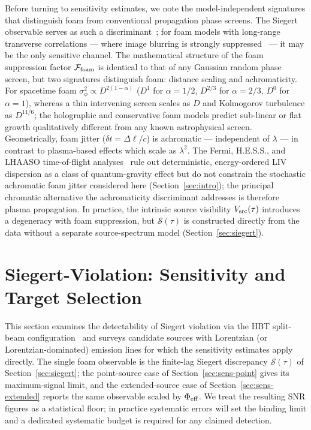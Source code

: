 \documentclass[aps,prd,onecolumn,amsmath,amssymb]{revtex4-2}
\begin{document}
Before turning to sensitivity estimates, we note the model-independent
signatures that distinguish foam from conventional propagation phase
screens.
The Siegert observable serves as such a discriminant~\cite{Carlip2023}; for foam models with
long-range transverse correlations --- where image blurring is strongly
suppressed~\cite{LeeZurekChen2024} --- it may be the only sensitive
channel.  The mathematical structure of the foam suppression factor
$\mathcal{F}_{\rm foam}$ is identical to that of any Gaussian random
phase screen, but two signatures distinguish foam: distance scaling and
achromaticity.  For spacetime foam
$\sigma_\phi^2\propto D^{2(1-\alpha)}$ ($D^1$ for $\alpha=1/2$,
$D^{2/3}$ for $\alpha=2/3$, $D^0$ for $\alpha=1$), whereas a thin
intervening screen scales as $D$ and Kolmogorov turbulence as
$D^{11/6}$; the holographic and conservative foam models predict
sub-linear or flat growth qualitatively different from any known
astrophysical screen.  Geometrically, foam jitter
($\delta t=\Delta\ell/c$) is achromatic --- independent of $\lambda$ ---
in contrast to plasma-based effects which scale as $\lambda^2$.  The
Fermi, H.E.S.S., and LHAASO time-of-flight analyses~\cite{Fermi2009,HESS2008,LHAASO2024}
rule out deterministic, energy-ordered LIV dispersion as a class of
quantum-gravity effect but do not constrain the stochastic achromatic
foam jitter considered here (Section~\ref{sec:intro}); the principal
chromatic alternative the achromaticity discriminant addresses is
therefore plasma propagation.  In practice, the intrinsic source
visibility $V_{\rm src}(\tau)$ introduces a degeneracy with foam
suppression, but $\mathcal{S}(\tau)$ is constructed directly from the
data without a separate source-spectrum model
(Section~\ref{sec:siegert}).

\section{Siegert-Violation: Sensitivity and Target Selection}
\label{sec:prospects}

This section examines the detectability of Siegert violation via the HBT
split-beam configuration~\cite{HBT1956,Foellmi2009,Dravins2013,Guerin2017}
and surveys candidate sources with Lorentzian (or Lorentzian-dominated)
emission lines for which the sensitivity estimates apply directly. The
single foam observable is the finite-lag Siegert discrepancy
$\mathcal{S}(\tau)$ of Section~\ref{sec:siegert}; the point-source case
of Section~\ref{sec:sens-point} gives its maximum-signal limit, and the
extended-source case of Section~\ref{sec:sens-extended} reports the same
observable scaled by $\Phi_{\rm eff}$.  We treat the resulting SNR
figures as a statistical floor; in practice systematic errors will set
the binding limit and a dedicated systematic budget is required for any
claimed detection.
\end{document}
